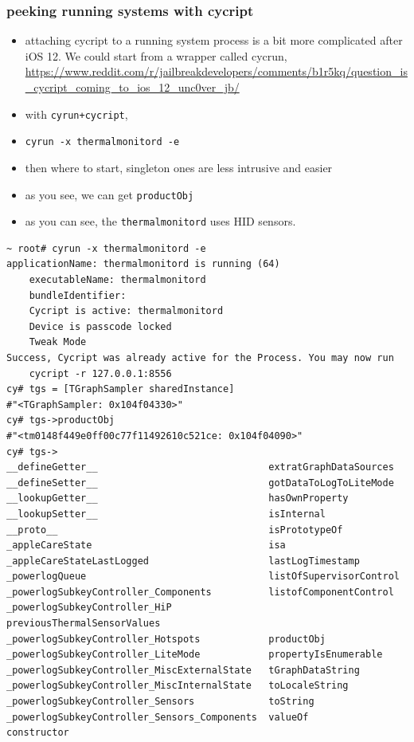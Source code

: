 \documentclass{beamer}
\begin{document}
\begin{frame}
  \frametitle{peeking running systems with cycript}
  \begin{itemize}
  \item attaching cycript to a running system process is a bit more complicated after iOS 12. We could start from a wrapper called cycrun, \url{https://www.reddit.com/r/jailbreakdevelopers/comments/b1r5kq/question\_is\_cycript\_coming\_to\_ios\_12\_unc0ver\_jb/}
  \item with \texttt{cyrun+cycript},
  \item \texttt{cyrun -x thermalmonitord -e}
  \item then where to start, singleton ones are less intrusive and easier
  \item as you see, we can get \texttt{productObj}
  \item as you can see, the \texttt{thermalmonitord} uses HID sensors.
  \end{itemize}

  \tiny
  \begin{adjustbox}{varwidth=\maxdimen,max width=\linewidth,keepaspectratio}
    \begin{lstlisting}[basicstyle=\tiny,caption={Cyrun},label=cyrun,breaklines]
~ root# cyrun -x thermalmonitord -e 
applicationName: thermalmonitord is running (64)
    executableName: thermalmonitord
    bundleIdentifier: 
    Cycript is active: thermalmonitord
    Device is passcode locked
    Tweak Mode
Success, Cycript was already active for the Process. You may now run
    cycript -r 127.0.0.1:8556
cy# tgs = [TGraphSampler sharedInstance]
#"<TGraphSampler: 0x104f04330>"
cy# tgs->productObj 
#"<tm0148f449e0ff00c77f11492610c521ce: 0x104f04090>"
cy# tgs->
__defineGetter__                              extratGraphDataSources
__defineSetter__                              gotDataToLogToLiteMode
__lookupGetter__                              hasOwnProperty
__lookupSetter__                              isInternal
__proto__                                     isPrototypeOf
_appleCareState                               isa
_appleCareStateLastLogged                     lastLogTimestamp
_powerlogQueue                                listOfSupervisorControl
_powerlogSubkeyController_Components          listofComponentControl
_powerlogSubkeyController_HiP                 previousThermalSensorValues
_powerlogSubkeyController_Hotspots            productObj
_powerlogSubkeyController_LiteMode            propertyIsEnumerable
_powerlogSubkeyController_MiscExternalState   tGraphDataString
_powerlogSubkeyController_MiscInternalState   toLocaleString
_powerlogSubkeyController_Sensors             toString
_powerlogSubkeyController_Sensors_Components  valueOf
constructor
    \end{lstlisting}
  \end{adjustbox}


\end{frame}
\end{document}
